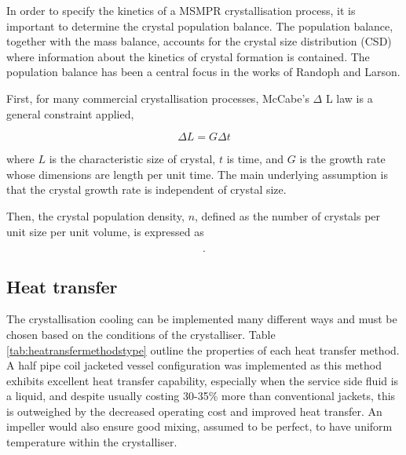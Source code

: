 In order to specify the kinetics of a MSMPR crystallisation process, it is important to determine the crystal population balance. The population balance, together with the mass balance, accounts for the crystal size distribution (CSD) where information about the kinetics of crystal formation is contained. The population balance has been a central focus in the works of Randoph and Larson. \cite{randolph larson}

First, for many commercial crystallisation processes, McCabe's $\Delta$ L law is a general constraint applied,

\begin{equation} \label{eq: McCabe deltaL}
    \Delta L = G \Delta t
\end{equation}

\noindent where $L$ is the characteristic size of crystal, $t$ is time, and $G$ is the growth rate whose dimensions are length per unit time. The main underlying assumption is that the crystal growth rate is independent of crystal size. 

Then, the crystal population density, $n$, defined as the number of crystals per unit size per unit volume, is expressed as 

\begin{equation} \label{eq:crystal population density definition}
    .
\end{equation}






\subsection{Heat transfer}

The crystallisation cooling can be implemented many different ways and must be chosen based on the conditions of the crystalliser. Table \ref{tab:heatransfermethodstype} outline the properties of each heat transfer method. A half pipe coil jacketed vessel configuration was implemented as this method exhibits excellent heat transfer capability, especially when the service side fluid is a liquid, and despite usually costing 30-35\% more than conventional jackets, this is outweighed by the decreased operating cost and improved heat transfer. An impeller would also ensure good mixing, assumed to be perfect, to have uniform temperature within the crystalliser. 

